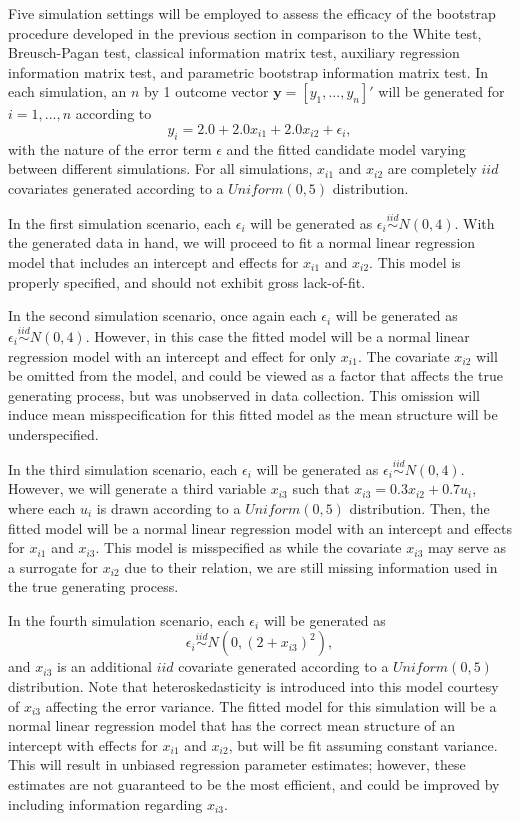 \documentclass[sn-mathphys-ay]{sn-jnl}
\begin{document}
Five simulation settings will be employed to assess the efficacy of the bootstrap procedure developed in the previous section in comparison to the White test, Breusch-Pagan test, classical information matrix test, auxiliary regression information matrix test, and parametric bootstrap information matrix test. In each simulation, an $n$ by 1 outcome vector $\bm{y} = [y_1,...,y_n]'$ will
be generated for $i = 1,...,n$ according to
\begin{equation*}
	y_i = 2.0 + 2.0 x_{i1} + 2.0 x_{i2} + \epsilon_i , 
\end{equation*}
with the nature of the error term $\epsilon$ and the fitted candidate model varying between different simulations. For all simulations, $x_{i1}$ and $x_{i2}$ are completely $iid$ covariates generated according to
a $Uniform(0,5)$ distribution.

In the first simulation scenario, each $\epsilon_i$ will be generated as $\epsilon_i \stackrel{iid}{\sim} N(0,4)$. With the generated data in hand, we will proceed to fit a normal linear regression model that includes an intercept and effects for $x_{i1}$ and $x_{i2}$. This model
is properly specified, and should not exhibit gross lack-of-fit.

In the second simulation scenario, once again each $\epsilon_i$ will be generated as $\epsilon_i \stackrel{iid}{\sim} N(0,4)$.
However, in this case the fitted model will be a normal linear regression model with an intercept and effect for only
$x_{i1}$. The covariate $x_{i2}$ will be omitted from the model, and could be viewed as a factor that affects the true generating process, but
was unobserved in data collection. This omission will induce mean misspecification for this fitted model as the mean structure will be underspecified.

In the third simulation scenario, each $\epsilon_i$ will be generated as $\epsilon_i \stackrel{iid}{\sim} N(0,4)$. 
However, we will generate a third variable $x_{i3}$ such that $x_{i3} = 0.3 x_{i2} + 0.7 u_i$, where each $u_i$ is drawn according to a $Uniform(0,5)$ distribution.
Then, the fitted model will be a normal linear regression model with an intercept and effects for $x_{i1}$ and $x_{i3}$. This model is misspecified as while the covariate $x_{i3}$ 
may serve as a surrogate for $x_{i2}$ due to their relation, we are still missing information used in the true generating process.

In the fourth simulation scenario, each $\epsilon_i$ will be generated as
\[ \epsilon_i \stackrel{iid}{\sim} N \left( 0,(2 + x_{i3})^2 \right) ,\]
and $x_{i3}$ is an additional $iid$ covariate
generated according to a $Uniform(0,5)$ distribution. Note that heteroskedasticity is introduced into this model courtesy of $x_{i3}$ affecting the error variance. The fitted model for
this simulation will be a normal linear regression model that has the correct mean structure of an intercept with effects for $x_{i1}$ and $x_{i2}$, but will be fit assuming constant variance.
This will result in unbiased regression parameter estimates; however, these estimates are not guaranteed to be the most efficient, and could be improved by including information regarding $x_{i3}$.
\end{document}
